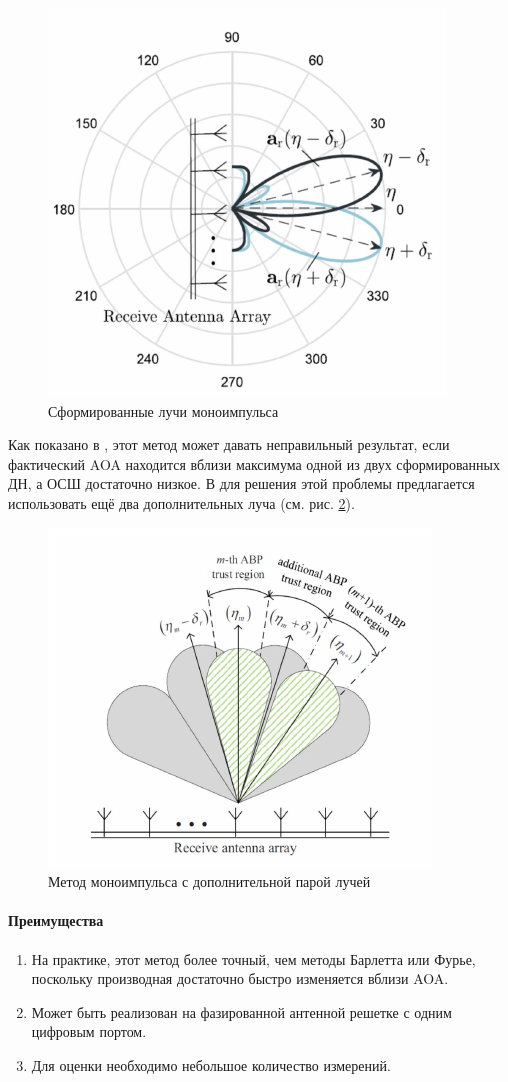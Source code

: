 \begin{figure}[ht!]
    \centering
    \includegraphics[width=0.45\linewidth]{figs/fig3.13}
    \caption{Сформированные лучи моноимпульса \cite{Zhu2016}}
    \label{fig:}
\end{figure}

Как показано в  \cite{Sherman2011},
этот метод может давать неправильный результат, если фактический AOA
находится вблизи максимума одной из двух сформированных ДН, а ОСШ достаточно низкое. 
В \cite{Sherman2011} для решения этой проблемы предлагается использовать ещё два дополнительных луча (см. рис. \ref{fig:3.14}).

\begin{figure}[ht!]
    \centering
    \includegraphics[width=0.6\linewidth]{figs/fig3.14}
    \caption{Метод моноимпульса с дополнительной парой лучей \cite{Tuncer2009}}
    \label{fig:3.14}
\end{figure}

\paragraph{Преимущества}%
\label{par:preimushchestva}

\begin{enumerate}
    \item На практике, этот метод более точный, чем методы Барлетта или Фурье, поскольку производная достаточно быстро изменяется вблизи AOA.
    \item Может быть реализован на фазированной антенной решетке с одним цифровым портом.
    \item Для оценки необходимо небольшое количество измерений. 
\end{enumerate}

